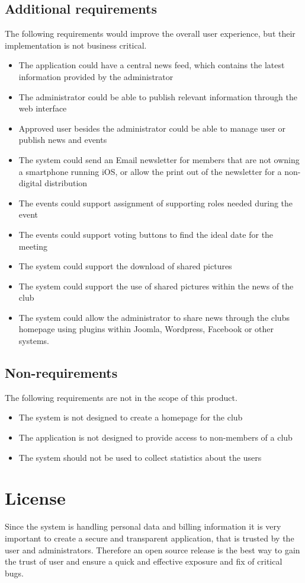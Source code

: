 \section{Additional requirements}
The following requirements would improve the overall user experience, but their implementation is not business critical.
\begin{itemize}
\item The application could have a central news feed, which contains the latest information provided by the administrator
\item The administrator could be able to publish relevant information through the web interface
\item Approved user besides the administrator could be able to manage user or publish news and events
\item The system could send an Email newsletter for members that are not owning a smartphone running iOS, or allow the print out of the newsletter for a non-digital distribution
\item The events could support assignment of supporting roles needed during the event
\item The events could support voting buttons to find the ideal date for the meeting
\item The system could support the download of shared pictures
\item The system could support the use of shared pictures within the news of the club
\item The system could allow the administrator to share news through the clubs homepage using plugins within Joomla, Wordpress, Facebook or other systems.
\end{itemize}

\section{Non-requirements} %
The following requirements are not in the scope of this product.
\begin{itemize}
\item The system is not designed to create a homepage for the club
\item The application is not designed to provide access to non-members of a club
\item The system should not be used to collect statistics about the users
\end{itemize}

\chapter{License}
Since the system is handling personal data and billing information it is very important to create a secure and transparent application, that is trusted by the user and administrators. Therefore an open source release is the best way to gain the trust of user and ensure a quick and effective exposure and fix of critical bugs. 

